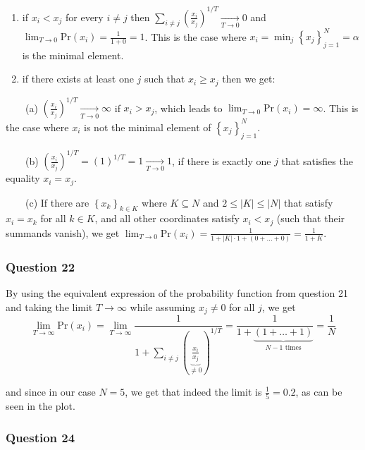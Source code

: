 \documentclass[11pt]{article}
\begin{document}
\begin{enumerate}
\def\labelenumi{\arabic{enumi}.}
\item
  if \(x_{i}<x_{j}\) for every \(i\neq j\) then
  \(\sum_{i\neq j}\left(\frac{x_{i}}{x_{j}}\right)^{1/T}\xrightarrow[T\to0]{}0\)
  and \(\lim_{T\to0}\text{Pr}\left(x_{i}\right)=\frac{1}{1+0}=1\). This
  is the case where
  \(x_{i}=\min_{j}\left\{ x_{j}\right\} _{j=1}^{N}=\alpha\) is the
  minimal element.
\item
  if there exists at least one \(j\) such that \(x_{i}\geq x_{j}\) then
  we get:
\end{enumerate}

\(\qquad\)(a)
\(\left(\frac{x_{i}}{x_{j}}\right)^{1/T}\xrightarrow[T\to0]{}\infty\) if
\(x_{i}>x_{j}\), which leads to
\(\lim_{T\to0}\text{Pr}\left(x_{i}\right)=\infty\). This is the case
where \(x_{i}\) is not the minimal element of
\(\left\{ x_{j}\right\} _{j=1}^{N}\).

\(\qquad\)(b)
\(\left(\frac{x_{i}}{x_{j}}\right)^{1/T}=\left(1\right)^{1/T}=1\xrightarrow[T\to0]{}1\),
if there is exactly one \(j\) that satisfies the equality
\(x_{i}=x_{j}\).

\(\qquad\)(c) If there are \(\left\{ x_{k}\right\} _{k\in K}\) where
\(K\subseteq N\) and \(2\leq\left|K\right|\leq\left|N\right|\) that
satisfy \(x_{i}=x_{k}\) for all \(k\in K\), and all other coordinates
satisfy \(x_{i}<x_{j}\) (such that their summands vanish), we get
\(\lim_{T\to0}\text{Pr}\left(x_{i}\right)=\frac{1}{1+\left|K\right|\cdot1+\left(0+\dots+0\right)}=\frac{1}{1+K}\).

    \subsubsection{Question 22}\label{question-22}

By using the equivalent expression of the probability function from
question 21 and taking the limit \(T\to\infty\) while assuming
\(x_{j}\neq0\) for all \(j\), we get
\[\lim_{T\to\infty}\text{Pr}\left(x_{i}\right)=\lim_{T\to\infty}\frac{1}{1+\sum_{i\neq j}\left(\underbrace{\frac{x_{i}}{x_{j}}}_{\neq0}\right)^{1/T}}=\frac{1}{1+\underbrace{\left(1+\dots+1\right)}_{N-1\text{ times}}}=\frac{1}{N}\]

and since in our case \(N=5\), we get that indeed the limit is
\(\frac{1}{5}=0.2\), as can be seen in the plot.

    \subsubsection{Question 24}\label{question-24}
\end{document}
